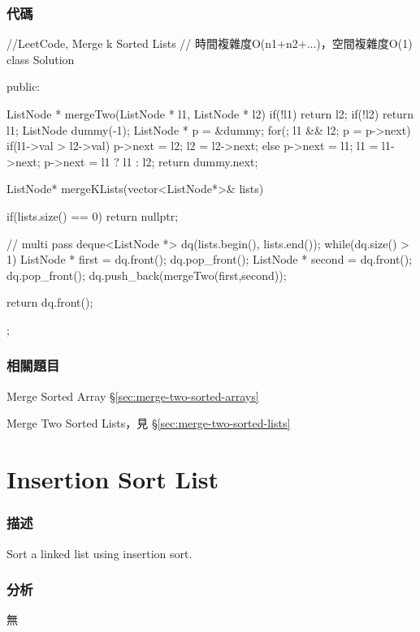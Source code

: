 \subsubsection{代碼}
\begin{Code}
//LeetCode, Merge k Sorted Lists
// 時間複雜度O(n1+n2+...)，空間複雜度O(1)
class Solution {
public:

    ListNode * mergeTwo(ListNode * l1, ListNode * l2){
        if(!l1) return l2;
        if(!l2) return l1;
        ListNode dummy(-1);
        ListNode * p = &dummy;
        for(; l1 && l2; p = p->next){
            if(l1->val > l2->val){
                p->next = l2; l2 = l2->next;
            }
            else{
                p->next = l1; l1 = l1->next;
            }
        }
        p->next = l1 ? l1 : l2;
        return dummy.next;
    }

    ListNode* mergeKLists(vector<ListNode*>& lists) {
        if(lists.size() == 0) return nullptr;

        // multi pass
        deque<ListNode *> dq(lists.begin(), lists.end());
        while(dq.size() > 1){
            ListNode * first = dq.front(); dq.pop_front();
            ListNode * second = dq.front(); dq.pop_front();
            dq.push_back(mergeTwo(first,second));
        }

        return dq.front();
    }
};
\end{Code}


\subsubsection{相關題目}
\begindot
\item Merge Sorted Array \S \ref{sec:merge-two-sorted-arrays}
\item Merge Two Sorted Lists，見 \S \ref{sec:merge-two-sorted-lists}
\myenddot


\section{Insertion Sort List} %
\label{sec:insertion-sort-list}


\subsubsection{描述}
Sort a linked list using insertion sort.


\subsubsection{分析}
無


